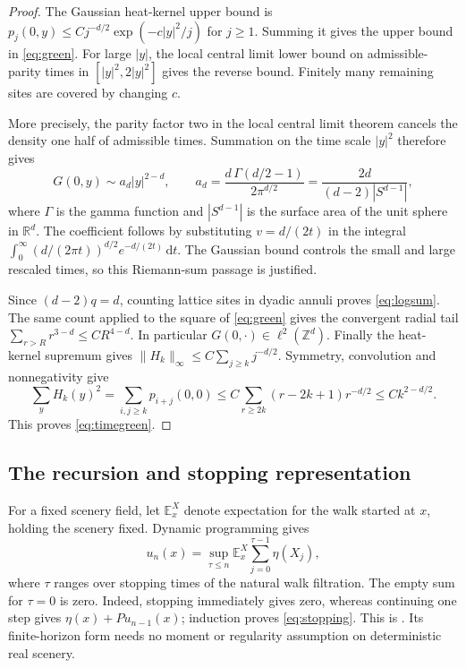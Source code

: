 \documentclass[11pt]{amsart}
\theoremstyle{remark}
\newcommand{\Z}{\mathbb Z}
\newcommand{\E}{\mathbb E}
\newcommand{\dd}{\,\mathrm d}
\begin{document}
\begin{proof}
The Gaussian heat-kernel upper bound is
$p_j(0,y)\le Cj^{-d/2}\exp(-c|y|^2/j)$ for $j\ge1$.
Summing it gives the upper bound in \eqref{eq:green}. For large $|y|$,
the local central limit lower bound on admissible-parity times in
$[|y|^2,2|y|^2]$ gives the reverse bound. Finitely many remaining sites
are covered by changing $c$.

More precisely, the parity factor two in the local central limit theorem
cancels the density one half of admissible times. Summation on the time
scale $|y|^2$ therefore gives
\[
 G(0,y)\sim a_d|y|^{2-d},\qquad
 a_d=\frac{d\,\Gamma(d/2-1)}{2\pi^{d/2}}
     =\frac{2d}{(d-2)|S^{d-1}|},
\]
where $\Gamma$ is the gamma function and $|S^{d-1}|$ is the surface area
of the unit sphere in $\mathbb R^d$.
The coefficient follows by substituting $v=d/(2t)$ in the integral
$\int_0^\infty(d/(2\pi t))^{d/2}e^{-d/(2t)}\dd t$.
The Gaussian bound controls the small and large rescaled times, so this
Riemann-sum passage is justified.

Since $(d-2)q=d$, counting lattice sites in dyadic annuli proves
\eqref{eq:logsum}. The same count applied to the square of
\eqref{eq:green} gives the convergent radial tail
$\sum_{r>R}r^{3-d}\le CR^{4-d}$. In particular $G(0,\cdot)\in\ell^2(\Z^d)$.
Finally the heat-kernel supremum gives
$\|H_k\|_\infty\le C\sum_{j\ge k}j^{-d/2}$.
Symmetry, convolution and nonnegativity give
\[
 \sum_yH_k(y)^2
 =\sum_{i,j\ge k}p_{i+j}(0,0)
 \le C\sum_{r\ge2k}(r-2k+1)r^{-d/2}
 \le Ck^{2-d/2}.
\]
This proves \eqref{eq:timegreen}.
\end{proof}

\subsection{The recursion and stopping representation}
For a fixed scenery field, let $\E_x^X$ denote expectation for the walk
started at $x$, holding the scenery fixed. Dynamic programming gives
\begin{equation}\label{eq:stopping}
 u_n(x)=\sup_{\tau\le n}\E_x^X\sum_{j=0}^{\tau-1}\eta(X_j),
\end{equation}
where $\tau$ ranges over stopping times of the natural walk filtration.
The empty sum for $\tau=0$ is zero. Indeed, stopping immediately gives
zero, whereas continuing one step gives $\eta(x)+Pu_{n-1}(x)$;
induction proves \eqref{eq:stopping}. This is
\cite[Theorem~2.2, p.~15]{BP}. Its finite-horizon form needs no moment or
regularity assumption on deterministic real scenery.
\end{document}
